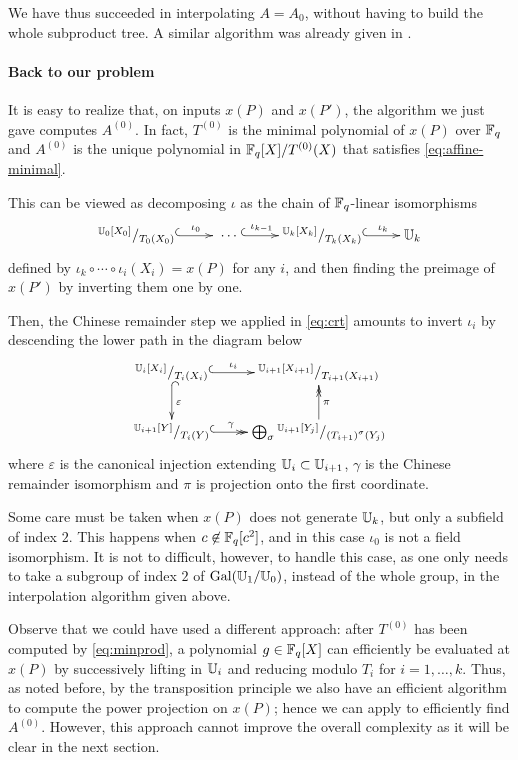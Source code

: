 We have thus succeeded in interpolating $A=A_0$, without having to
build the whole subproduct tree. A similar algorithm was already given
in \cite{enge+morain03}.


\paragraph{Back to our problem}
It is easy to realize that, on inputs $x(P)$ and $x(P')$, the
algorithm we just gave computes $A^{(0)}$. In fact, $T^{(0)}$ is
the minimal polynomial of $x(P)$ over $\mathbb{F}_q$ and $A^{(0)}$ is the
unique polynomial in $\mathbb{F}_q[X]/T^{(0)}(X)$ that satisfies
\eqref{eq:affine-minimal}.

This can be viewed as decomposing $\iota$ as the chain of
$\mathbb{F}_q$-linear isomorphisms
\begin{equation}
  \xymatrix{
    ^{\U_0[X_0]}/_{T_0(X_0)} \ar@{^{(}->}[r]^-{\iota_0} &
    \;\cdots\; \ar@{^{(}->}[r]^-{\iota_{k-1}} &
    ^{\U_k[X_k]}/_{T_k(X_k)} \ar@{^{(}->}[r]^-{\iota_k} &
    \U_k
  }
\end{equation}
defined by $\iota_k\circ\cdots\circ\iota_i(X_i) = x(P)$ for any $i$,
and then finding the preimage of $x(P')$ by inverting them one by
one.

Then, the Chinese remainder step we applied in \eqref{eq:crt} amounts
to invert $\iota_i$ by descending the lower path in the diagram below
\begin{equation}
  \xymatrix{
    ^{\U_i[X_i]}/_{T_i(X_i)} \ar@{^{(}->}[r]^-{\iota_i} \ar@{^{(}->}[d]^{\varepsilon} &
    ^{\U_{i+1}[X_{i+1}]}/_{T_{i+1}(X_{i+1})} \\
    ^{\U_{i+1}[Y]}/_{T_i(Y)} \ar@{^{(}->>}[r]^-{\gamma} &
    \bigoplus_\sigma {}^{\U_{i+1}[Y_{j}]}/_{\left(T_{i+1}\right)^\sigma(Y_{j})} \ar@{->>}[u]_{\pi}
  }
\end{equation}
where $\varepsilon$ is the canonical injection extending
$\mathbb{U}_i\subset\mathbb{U}_{i+1}$, $\gamma$ is the Chinese remainder isomorphism
and $\pi$ is projection onto the first coordinate.

Some care must be taken when $x(P)$ does not generate $\mathbb{U}_k$, but only
a subfield of index $2$. This happens when $c\not\in\mathbb{F}_q[c^2]$, and in
this case $\iota_0$ is not a field isomorphism. It is not to
difficult, however, to handle this case, as one only needs to take a
subgroup of index $2$ of $\operatorname{Gal}(\mathbb{U}_1/\mathbb{U}_0)$, instead of the whole
group, in the interpolation algorithm given above.


Observe that we could have used a different approach: after $T^{(0)}$
has been computed by \eqref{eq:minprod}, a polynomial $g\in\mathbb{F}_q[X]$
can efficiently be evaluated at $x(P)$ by successively lifting in
$\mathbb{U}_i$ and reducing modulo $T_i$ for $i=1,\ldots,k$. Thus, as noted
before, by the transposition principle we also have an efficient
algorithm to compute the power projection on $x(P)$; hence we can
apply \cite{PS06} to efficiently find $A^{(0)}$. However, this
approach cannot improve the overall complexity as it will be clear
in the next section.



